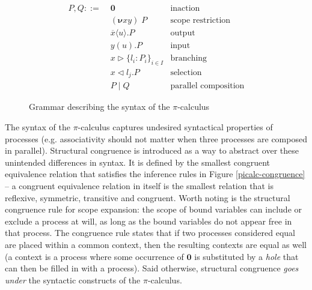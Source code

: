 \documentclass{mproj}
\newcommand{\PO}{\mathbf{0}}
\newcommand{\comp}[2]{#1 \mid #2}
\newcommand{\new}[2]{(\boldsymbol{\nu} #1 #2) \;}
\newcommand{\cout}[2]{\overline{#1}\langle#2\rangle.}
\newcommand{\cin}[2]{#1(#2).}
\newcommand{\select}[2]{#1\triangleleft#2.}
\newcommand{\branch}[2]{#1\triangleright#2}
\newcommand{\picalc}{$\pi$-calculus}
\begin{document}
\begin{figure}[H]
    \begin{align*}
    P,Q ::= \; &\PO                      & \text{inaction}             \\
               &\new{x}{y}P              & \text{scope restriction}    \\
               &\cout{x}{u}P             & \text{output}               \\
               &\cin{y}{u}P              & \text{input}                \\
               &\branch{x}
               {\{l_i : P_i\}_{i \in I}} & \text{branching}            \\
               &\select{x}{l_j}P         & \text{selection}            \\
               &\comp{P}{Q}              & \text{parallel composition}
    \end{align*}
    \caption{Grammar describing the syntax of the \picalc{}}
    \label{picalc-syntax}
\end{figure}

The syntax of the \picalc{} captures undesired syntactical properties of processes (e.g. associativity should not matter when three processes are composed in parallel). Structural congruence is introduced as a way to abstract over these unintended differences in syntax. It is defined by the smallest congruent equivalence relation that satisfies the inference rules in Figure \ref{picalc-congruence} -- a congruent equivalence relation in itself is the smallest relation that is reflexive, symmetric, transitive and congruent. Worth noting is the structural congruence rule for scope expansion: the scope of bound variables can include or exclude a process at will, as long as the bound variables do not appear free in that process. The congruence rule states that if two processes considered equal are placed within a common context, then the resulting contexts are equal as well (a context is a process where some occurrence of $\PO$ is substituted by a \emph{hole} that can then be filled in with a process). Said otherwise, structural congruence \emph{goes under} the syntactic constructs of the \picalc{}.
\end{document}
